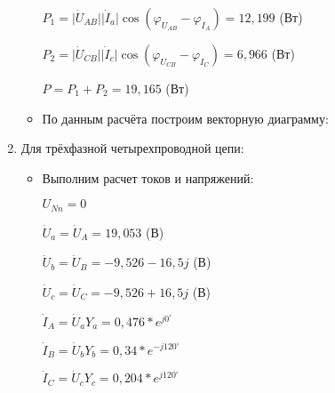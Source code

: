 \begin{enumerate}
\begin{itemize}
\begin{center}
$ P_{1} = \vert \dot{U}_{AB} \vert \vert \dot{I}_{a} \vert \cos{(\varphi_{U_{AB}} - \varphi_{I_{A}})} = 12,199 $ (Вт)

\vspace{2mm}

$ P_{2} = \vert \dot{U}_{CB} \vert \vert \dot{I}_{c} \vert \cos{(\varphi_{U_{CB}} - \varphi_{I_{C}})} = 6,966 $ (Вт)

\vspace{2mm}

$ P = P_{1} + P_{2} = 19,165 $ (Вт)

\end{center}
\item По данным расчёта построим векторную диаграмму:

\vspace{70mm}

\end {itemize}


\item Для трёхфазной четырехпроводной цепи:

\begin{itemize}
\item Выполним расчет токов и напряжений:\par
\begin{minipage}[h]{0.45\linewidth}

$ U_{Nn} = 0 $

\vspace{2mm}

$ \dot{U}_{a} = \dot{U}_{A} = 19,053 $ (В)

\vspace{2mm}

$ \dot{U}_{b} = \dot{U}_{B} = -9,526 - 16,5j $ (В)

\vspace{2mm}

$ \dot{U}_{c} = \dot{U}_{C} = -9,526 + 16,5j $ (В)


\end{minipage}
\hfill
\begin{minipage}[h]{0.45\linewidth}

$ \dot{I}_{A} = \dot{U}_{a} Y_{a} = 0,476*e^{j0^{\circ}} $

\vspace{2mm}

$ \dot{I}_{B} = \dot{U}_{b} Y_{b} = 0,34*e^{-j120^{\circ}} $

\vspace{2mm}

$ \dot{I}_{C} = \dot{U}_{c} Y_{c} = 0,204*e^{j120^{\circ}} $


\end{minipage}
\end{itemize}
\end{enumerate}
